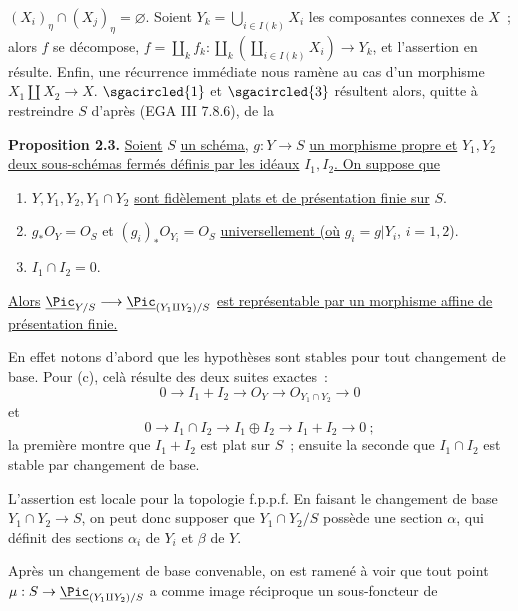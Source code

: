 
\((X_i)_\eta\cap(X_j)_\eta=\varnothing\). Soient \(Y_k=\bigcup_{i\in I(k)}X_i\) les composantes connexes de \(X\)~; alors \(f\) se décompose, \(f=\coprod_k f_k:\coprod_k(\coprod_{i\in I(k)}X_i)\longrightarrow Y_k\), et l'assertion en résulte. Enfin, une récurrence immédiate nous ramène au cas d'un morphisme \(X_1\amalg X_2\to X\). \(\sgacircled{1}\) et \(\sgacircled{3}\) résultent alors, quitte à restreindre \(S\) d'après (EGA III 7.8.6), de la

\textbf{Proposition 2.3.} \uline{Soient} \(S\) \uline{un schéma,} \(g:Y\to S\) \uline{un morphisme propre et} \(Y_1,Y_2\) \uline{deux sous-schémas fermés définis par les idéaux} \(I_1,I_2\)\uline{. On suppose que}
\begin{enumerate}[label=\alph*)]
\item \(Y,Y_1,Y_2,Y_1\cap Y_2\) \uline{sont fidèlement plats et de présentation finie sur} \(S\).
\item \(g_*{O}_Y={O}_S\) et \((g_i)_*{O}_{Y_i}={O}_S\) \uline{universellement (où} \(g_i=g|Y_i\), \(i=1,2\)).
\item \(I_1\cap I_2=0\).
\end{enumerate}
\uline{Alors} \(\underline{\Pic}_{Y/S}\longrightarrow \underline{\Pic}_{(Y_1\amalg Y_2)/S}\) \uline{est représentable par un morphisme affine de présentation finie.}

En effet notons d'abord que les hypothèses sont stables pour tout changement de base. Pour (c), celà résulte des deux suites exactes~:
\[
  0\longrightarrow I_1+I_2\longrightarrow{O}_Y
  \longrightarrow{O}_{Y_1\cap Y_2}\longrightarrow0
\]
et
\[
  0\longrightarrow I_1\cap I_2\longrightarrow I_1\oplus I_2
  \longrightarrow I_1+I_2\longrightarrow0~;
\]
la première montre que \(I_1+I_2\) est plat sur \(S\)~; ensuite la seconde que \(I_1\cap I_2\) est stable par changement de base.

L'assertion est locale pour la topologie f.p.p.f. En faisant le changement de base \(Y_1\cap Y_2\to S\), on peut donc supposer que \(Y_1\cap Y_2/S\) possède une section \(\alpha\), qui définit des sections \(\alpha_i\) de \(Y_i\) et \(\beta\) de \(Y\).

Après un changement de base convenable, on est ramené à voir que tout point \(\mu:S\to\underline{\Pic}_{(Y_1\amalg Y_2)/S}\) a comme image réciproque un sous-foncteur de
